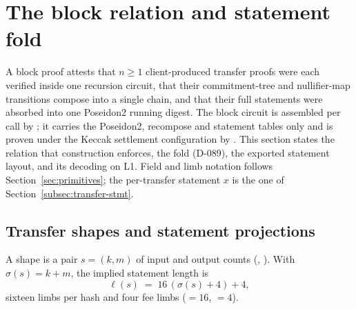 \section{The block relation and statement fold}
\label{sec:block}

A block proof attests that $n \ge 1$ client-produced transfer proofs were each
verified inside one recursion circuit, that their commitment-tree and
nullifier-map transitions compose into a single chain, and that their full
statements were absorbed into one Poseidon2 running digest. The block circuit is
assembled per call by 
; it carries the Poseidon2, recompose and
statement tables only  and is proven under
the Keccak settlement configuration by 
. This section states the relation that
construction enforces, the fold (D-089), the exported statement layout, and its
decoding on L1. Field and limb notation follows Section~\ref{sec:primitives}; the
per-transfer statement $x$ is the one of Section~\ref{subsec:transfer-stmt}.

\subsection{Transfer shapes and statement projections}
\label{subsec:block-shape}

\begin{definition}
\label{def:block-shape}
A shape is a pair $s=(k,m)$ of input and output counts
(, ).
With $\sigma(s) = k+m$, the implied statement length is
\begin{equation}
  \ell(s) \;=\; 16\,(\sigma(s)+4) + 4 ,
  \label{eq:block-len}
\end{equation}
sixteen limbs per hash and four fee limbs ($=16$,
$=4$).
\end{definition}

